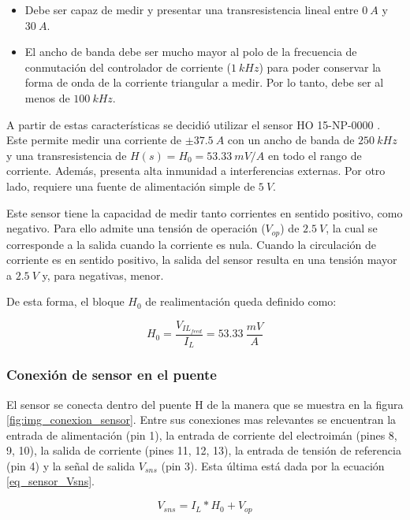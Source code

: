 \begin{itemize}
	\item Debe ser capaz de medir y presentar una transresistencia lineal entre $0\:A$ y $30\:A$.
	\item El ancho de banda debe ser mucho mayor al polo de la frecuencia de conmutación del controlador de corriente ($1\:kHz$) para poder conservar la forma de onda de la corriente triangular a medir. Por lo tanto, debe ser al menos de $100\:kHz$.	
\end{itemize}

A partir de estas características se decidió utilizar el sensor HO 15-NP-0000 \cite{HO15-NP}. Este permite medir una corriente de $\pm 37.5\:A$ con un ancho de banda de $250\:kHz$ y una transresistencia de $H(s)=H_0=53.33\:mV/A$ en todo  el rango de corriente. Además, presenta alta inmunidad a interferencias externas. Por otro lado, requiere una fuente de alimentación simple de $5\:V$.

Este sensor tiene la capacidad de medir tanto corrientes en sentido positivo, como negativo. Para ello admite una tensión de operación ($V_{op}$) de $2.5\:V$, la cual se corresponde a la salida cuando la corriente es nula. Cuando la circulación de corriente es en sentido positivo, la salida del sensor resulta en una tensión mayor a $2.5\:V$ y, para negativas, menor.

De esta forma, el bloque $H_0$ de realimentación queda definido como:

\begin{equation}
	H_0=\frac{V_{IL_{feed}}}{I_L}=53.33 \:\frac{mV}{A}
\end{equation}

\subsubsection{Conexión de sensor en el puente}

El sensor se conecta dentro del puente H de la manera que se muestra en la figura \ref{fig:img_conexion_sensor}. Entre sus conexiones mas relevantes se encuentran la entrada de alimentación (pin 1), la entrada de corriente del electroimán (pines 8, 9, 10), la salida de corriente (pines 11, 12, 13), la entrada de tensión de referencia (pin 4) y la señal de salida $V_{sns}$ (pin 3). Esta última está dada por la ecuación \ref{eq_sensor_Vsns}.

\begin{equation}\label{eq_sensor_Vsns}
	V_{sns}=I_L*H_0+V_{op}
\end{equation}


